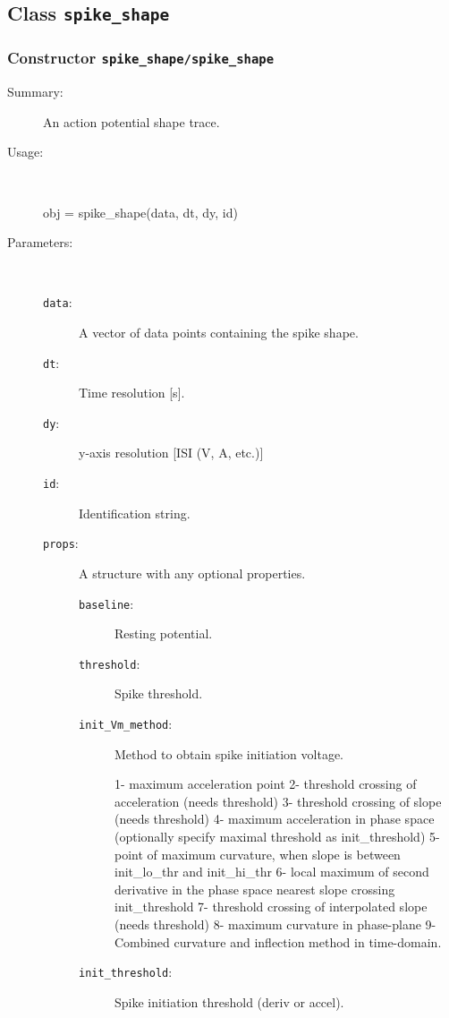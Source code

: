 \subsection{Class \texttt{spike\_shape}}%
%
\label{ref_spike_shape}%
\hypertarget{ref_spike_shape}{}%
\subsubsection[Constructor \texttt{spike\_shape}]{Constructor \texttt{spike\_shape/spike\_shape}}%
%
\label{ref_spike_shape__spike_shape}%
\hypertarget{ref_spike_shape__spike_shape}{}%
\begin{description}
\item[Summary:]An action potential shape trace.
%
\item[Usage:]~%
\begin{lyxcode}%
obj = spike\_shape(data, dt, dy, id)
%
\end{lyxcode}%
%
%
\item[Parameters:]~
\begin{description}%
\item[\texttt{data}:]
 A vector of data points containing the spike shape.
\item[\texttt{dt}:]
 Time resolution [s].
\item[\texttt{dy}:]
 y-axis resolution [ISI (V, A, etc.)]
\item[\texttt{id}:]
 Identification string.
\item[\texttt{props}:]
 A structure with any optional properties.
\begin{description}%
\item[\texttt{baseline}:]
 Resting potential.
\item[\texttt{threshold}:]
 Spike threshold.
\item[\texttt{init\_Vm\_method}:]
 Method to obtain spike initiation voltage.

1- maximum acceleration point
2- threshold crossing of acceleration (needs threshold)
3- threshold crossing of slope (needs threshold)
4- maximum acceleration in phase space
(optionally specify maximal threshold as init\_threshold)
5- point of maximum curvature, when slope is between 
init\_lo\_thr and init\_hi\_thr
6- local maximum of second derivative in the phase space
nearest slope crossing init\_threshold
7- threshold crossing of interpolated slope (needs threshold)
8- maximum curvature in phase-plane
9- Combined curvature and inflection method in time-domain.
\item[\texttt{init\_threshold}:]
 Spike initiation threshold (deriv or accel).


\end{description}
\end{description}
\end{description}
